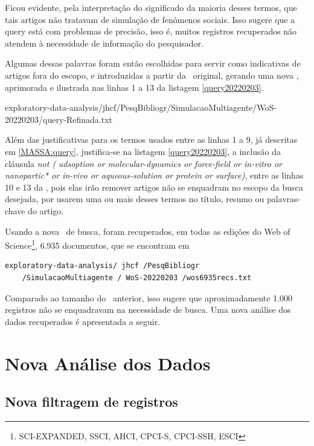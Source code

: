 Ficou evidente, pela interpretação do significado da maioria desses termos, que tais artigos não tratavam de simulação de fenômenos sociais. Isso sugere que a query está com problemas de precisão, isso é, muitos registros recuperados não atendem à necessidade de informação do pesquisador. 

Algumas dessas palavras foram então escolhidas para servir como indicativas de artigos fora do escopo, e introduzidas a partir da \query\  original, gerando uma nova \query, aprimorada e ilustrada nas linhas 1 a 13 da listagem \ref{query20220203}.


{exploratory-data-analysis/jhcf/PesqBibliogr/SimulacaoMultiagente/WoS-20220203/query-Refinada.txt}

Além das justificativas para os termos usados entre as linhas 1 a 9, já descritas em \ref{MASSA:query},  justifica-se na listagem \ref{query20220203}, a inclusão da cláusula \textit{not (
 adsoption or molecular-dynamics or force-field
 or in-vitro or nanopartic* or in-vivo
 or aqueous-solution or protein or surface)}, entre as linhas 10 e 13 da \query, pois elas irão remover artigos não se enquadram no escopo da busca desejada, por usarem uma ou mais desses termos no título, resumo ou palavras-chave do artigo.
 
Usando a nova \query\ de busca, foram recuperados, em todas as edições do Web of Science\footnote{SCI-EXPANDED, SSCI, AHCI, CPCI-S, CPCI-SSH, ESCI}, 6.935 documentos, que se encontram em
\begin{verbatim}
exploratory-data-analysis/ jhcf /PesqBibliogr 
    /SimulacaoMultiagente / WoS-20220203 /wos6935recs.txt 
\end{verbatim}
Comparado ao tamanho do \dataset\ anterior, isso sugere que aproximadamente 1.000 registros não se enquadravam na necessidade de busca.
Uma nova análise dos dados recuperados é apresentada a seguir.

\section{Nova Análise dos Dados}

\subsection{Nova filtragem de registros}

